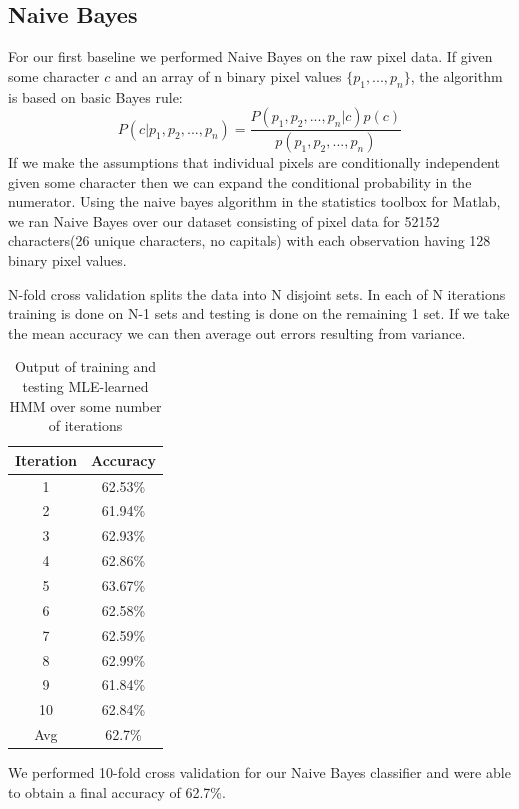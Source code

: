 \documentclass{article} %
\begin{document}
\subsection{Naive Bayes}
For our first baseline we performed Naive Bayes on the raw pixel data.
If given some character $c$ and an array of n binary pixel values $\{p_1, ..., p_n\}$, the algorithm is based on basic Bayes rule:
$$P(c|p_1, p_2, ... , p_n) = \frac{P(p_1, p_2, ... , p_n|c)p(c)}{p(p_1, p_2, ... , p_n)}$$
If we make the assumptions that individual pixels are conditionally independent given some character then we can expand the conditional probability in the numerator. Using the naive bayes algorithm in the statistics toolbox for Matlab, we ran Naive Bayes over our dataset consisting of pixel data for 52152 characters(26 unique characters, no capitals) with each observation having 128 binary pixel values.

N-fold cross validation splits the data into N disjoint sets. In each of N iterations training is done on N-1 sets and testing is done on the remaining 1 set. If we take the mean accuracy we can then average out errors resulting from variance.


\begin{table}[h]
\centering
\begin{tabular}{|c|c|}
\hline
Iteration & Accuracy \\
\hline
1 & 62.53\% \\
2 & 61.94\% \\
3 & 62.93\% \\
4 & 62.86\% \\
5 & 63.67\% \\
6 & 62.58\% \\
7 & 62.59\% \\
8 & 62.99\% \\
9 & 61.84\% \\
10 & 62.84\% \\
\hline
Avg & 62.7\% \\ 
\hline
\end{tabular}
\caption{Output of training and testing MLE-learned HMM over some number of iterations}
\label{tab:mid-logr-results}
\end{table}

We performed 10-fold cross validation for our Naive Bayes classifier and were able to obtain a final accuracy of 62.7\%.
\end{document}
